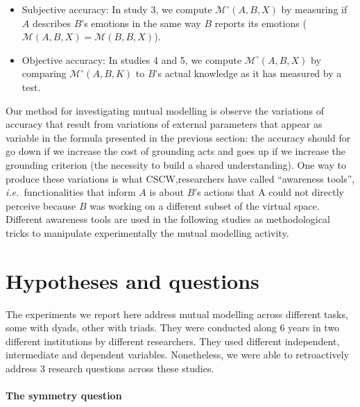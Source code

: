 \documentclass[natbib]{svjour3}
\newcommand{\ie}{{\textit{i.e.\ }}}
\newcommand{\M}[3]{{\mathcal{M}(#1, #2, #3)}}
\newcommand{\Model}[3]{{$\mathcal{M}^{\circ}(#1, #2, #3)$}}
\begin{document}
        \begin{itemize}

            \item Subjective accuracy: In study 3, we compute
                \Model{A}{B}{X} by measuring if $A$ describes
                $B$'s emotions in the same way $B$ reports its emotions 
                ($\M{A}{B}{X} = \M{B}{B}{X}$).

            \item Objective accuracy: In studies 4 and 5, we compute
                \Model{A}{B}{X} by comparing \Model{A}{B}{K} to $B$'s
                actual knowledge as it has measured by a test.

        \end{itemize}

Our method for investigating mutual modelling is observe the variations of  accuracy that result from variations of external parameters that appear as variable in the formula presented in the previous section: the accuracy should for go down if we increase the cost of grounding acts and goes up if we increase the grounding criterion (the necessity to build a shared understanding). One way to produce these variations is what CSCW,researchers have called
``awareness tools'', \ie functionalities that inform $A$ is about $B$'s actions
that A could not directly perceive because $B$ was working on a different subset
of the virtual space. Different awareness tools are used in the following studies as methodological tricks  to manipulate experimentally the  mutual modelling activity. 


\section*{Hypotheses and questions}

The experiments we report here address mutual modelling across different tasks,
some with dyads, other with triads. They were conducted along 6 years in two
different institutions by different researchers. They used different
independent, intermediate and dependent variables. Nonetheless, we were able to retroactively
address 3 research questions across these studies. 

\paragraph{The symmetry question}
\end{document}

